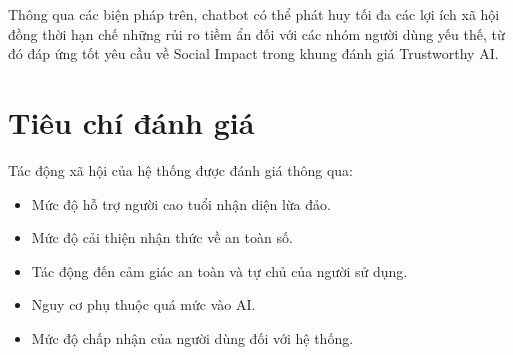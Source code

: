 Thông qua các biện pháp trên, chatbot có thể phát huy tối đa các lợi ích xã hội đồng thời hạn chế những rủi ro tiềm ẩn đối với các nhóm người dùng yếu thế, từ đó đáp ứng tốt yêu cầu về Social Impact trong khung đánh giá Trustworthy AI.

\section{Tiêu chí đánh giá}
Tác động xã hội của hệ thống được đánh giá thông qua:
\begin{itemize}
    \item Mức độ hỗ trợ người cao tuổi nhận diện lừa đảo.
\item Mức độ cải thiện nhận thức về an toàn số.
\item Tác động đến cảm giác an toàn và tự chủ của người sử dụng.
\item Nguy cơ phụ thuộc quá mức vào AI.
\item Mức độ chấp nhận của người dùng đối với hệ thống.
\end{itemize}
